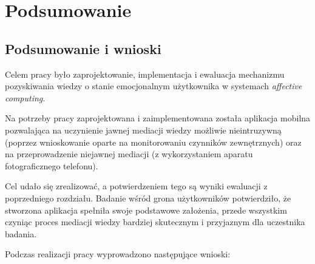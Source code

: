 \chapter{Podsumowanie}
\label{cha:podsumowanie}



\section{Podsumowanie i wnioski}
\label{sec:podsumowanieIWnioski}

Celem pracy było zaprojektowanie, implementacja i ewaluacja mechanizmu pozyskiwania wiedzy o  stanie emocjonalnym użytkownika w systemach \textit{affective computing}.  

Na potrzeby pracy zaprojektowana i zaimplementowana została aplikacja mobilna pozwalająca na uczynienie jawnej mediacji wiedzy możliwie nieintruzywną (poprzez wnioskowanie oparte na monitorowaniu czynników zewnętrznych) oraz na przeprowadzenie niejawnej mediacji (z wykorzystaniem aparatu fotograficznego telefonu). 

Cel udało się zrealizować, a potwierdzeniem tego są wyniki ewaluacji z poprzedniego rozdziału. Badanie wśród grona użytkowników potwierdziło, że stworzona aplikacja spełniła swoje podstawowe założenia, przede wszystkim czyniąc proces mediacji wiedzy bardziej skutecznym i przyjaznym dla uczestnika badania.

Podczas realizacji pracy wyprowadzono następujące wnioski:

